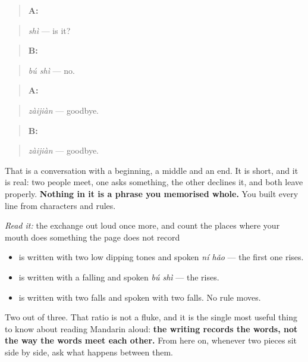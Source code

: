 \begin{quote}
\textbf{A:} 
\end{quote}

\begin{quote}
\emph{shì} — is it?
\end{quote}

\begin{quote}
\textbf{B:} 
\end{quote}

\begin{quote}
\emph{bú shì} — no.
\end{quote}

\begin{quote}
\textbf{A:} 
\end{quote}

\begin{quote}
\emph{zàijiàn} — goodbye.
\end{quote}

\begin{quote}
\textbf{B:} 
\end{quote}

\begin{quote}
\emph{zàijiàn} — goodbye.
\end{quote}

That is a conversation with a beginning, a middle and an end. It is short, and it is real: two people meet, one asks something, the other declines it, and both leave properly. \textbf{Nothing in it is a phrase you memorised whole.} You built every line from characters and rules.

\begin{grammarlens}[title={What you've built — and what stays invisible}]
\emph{Read it:} the exchange out loud once more, and count the places where your mouth does something the page does not record

\begin{itemize}
\raggedright
  \item \textbf{} is written with two low dipping tones and spoken \emph{ní hǎo} — the first one rises.
  \item \textbf{} is written with a falling  and spoken \emph{bú shì} — the  rises.
  \item \textbf{} is written with two falls and spoken with two falls. No rule moves.
\end{itemize}

Two out of three. That ratio is not a fluke, and it is the single most useful thing to know about reading Mandarin aloud: \textbf{the writing records the words, not the way the words meet each other.} From here on, whenever two pieces sit side by side, ask what happens between them.
\end{grammarlens}

